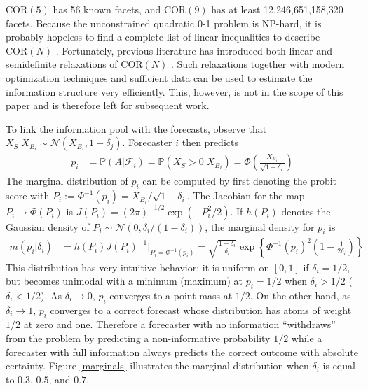 \documentclass[12pt]{article}
\renewcommand{\P}{\mathbb{P}}
\newcommand{\COR}{\text{COR}}
\theoremstyle{definition}
\theoremstyle{definition}
\def\one{{\bf 1}}
\def\P{{\mathbb P}}
\begin{document}
$\COR(5)$ has 56 known facets, and $\COR(9)$ has at least 12,246,651,158,320 facets. Because the unconstrained quadratic
0-1 problem is NP-hard, it is probably hopeless to find a complete
list of linear inequalities to describe $\COR(N)$ 
\citep{deza1997geometry}. Fortunately, previous literature has introduced both linear and semidefinite relaxations of $\COR(N)$ \citep{laurent1997connections}. Such relaxations together with modern optimization techniques and sufficient data can be used to estimate the information structure very efficiently. This, however, is not in the scope of this paper and is therefore left for subsequent work. 


To link the information pool with the forecasts, observe that $X_S | X_{B_i} \sim \mathcal{N}\left(X_{B_i}, 1-\delta_j\right)$. Forecaster $i$ then predicts
\begin{align}
p_i &= \P\left(A | \mathcal{F}_{i}\right) = \P\left(X_S > 0 | X_{B_i}\right) = \Phi\left( \frac{X_{B_i}}{\sqrt{1-\delta_i}}\right) \label{indFore}
\end{align}
The marginal distribution of $p_i$ can be computed by first denoting the probit score with $P_{i} := \Phi^{-1}(p_i) = X_{B_i}/\sqrt{1-\delta_i}$. The Jacobian for the map $P_{i} \to \Phi(P_i)$ is $J(P_i) = (2\pi)^{-1/2} \exp \left( - P_i^2/2   \right)$. If $h(P_i)$ denotes the Gaussian density of $P_i \sim \mathcal{N}\left(0, \delta_i / (1-\delta_i)\right)$, 
the marginal density for $p_i$ is
\begin{align*}
 m\left(p_i | \delta_i \right) &= h(P_i) J(P_i)^{-1} \big|_{P_i = \Phi^{-1}(p_i)} = \sqrt{\frac{1-\delta_i}{\delta_i}} \exp 
   \left\{ \Phi^{-1}(p_i)^2 \left(1-\frac{1}{2 \delta_i} \right) \right\} 
\end{align*}
This distribution has very intuitive behavior: it is uniform on $[0,1]$ if $\delta_i = 1/2$, but becomes 
unimodal with a minimum (maximum) at $p_i = 1/2$ when $\delta_i > 1/2$ ($\delta_i < 1/2$).  As $\delta_i \to 0$, $p_i$ converges to a point mass at $1/2$. On the other hand, as $\delta_i \to 1$, $p_i$ converges to
a correct forecast whose distribution has atoms of weight $1/2$ at
zero and one. Therefore a forecaster with no information ``withdraws'' from the problem by predicting a non-informative probability $1/2$ while a forecaster with full information always predicts the correct outcome with absolute certainty. Figure \ref{marginals} illustrates the marginal
distribution when $\delta_i$ is equal to $0.3$, $0.5$, and $0.7$.
\end{document}
